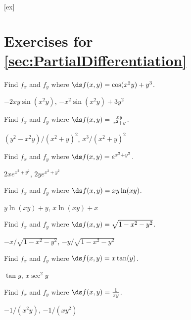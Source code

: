 [ex]
\section*{Exercises for \ref{sec:PartialDifferentiation}}

\begin{enumialphparenastyle}

\begin{ex}
Find $f_x$ and $f_y$ where $\ds f(x,y)=\cos(x^2y)+y^3$.
\begin{sol}
$-2xy\sin(x^2y)$, $-x^2\sin(x^2y)+3y^2$
\end{sol}
\end{ex}

\begin{ex}
Find $f_x$ and $f_y$ where $\ds f(x,y)={xy\over x^2+y}$.
\begin{sol}
$(y^2-x^2y)/(x^2+y)^2$, $x^3/(x^2+y)^2$
\end{sol}
\end{ex}

\begin{ex}
Find $f_x$ and $f_y$ where $\ds f(x,y)=e^{x^2+y^2}$.
\begin{sol}
$2xe^{x^2+y^2}$, $2ye^{x^2+y^2}$
\end{sol}
\end{ex}

\begin{ex}
Find $f_x$ and $f_y$ where $\ds f(x,y)=xy\ln(xy)$.
\begin{sol}
$y\ln(xy)+y$, $x\ln(xy)+x$
\end{sol}
\end{ex}

\begin{ex}
Find $f_x$ and $f_y$ where $\ds f(x,y)=\sqrt{1-x^2-y^2}$.
\begin{sol}
$-x/\sqrt{1-x^2-y^2}$, $-y/\sqrt{1-x^2-y^2}$
\end{sol}
\end{ex}

\begin{ex}
Find $f_x$ and $f_y$ where $\ds f(x,y)=x\tan(y)$.
\begin{sol}
$\tan y$, $x\sec^2 y$
\end{sol}
\end{ex}

\begin{ex}
Find $f_x$ and $f_y$ where $\ds f(x,y)={1\over xy}$.
\begin{sol}
$-1/(x^2y)$, $-1/(xy^2)$
\end{sol}
\end{ex}


\end{enumialphparenastyle}
